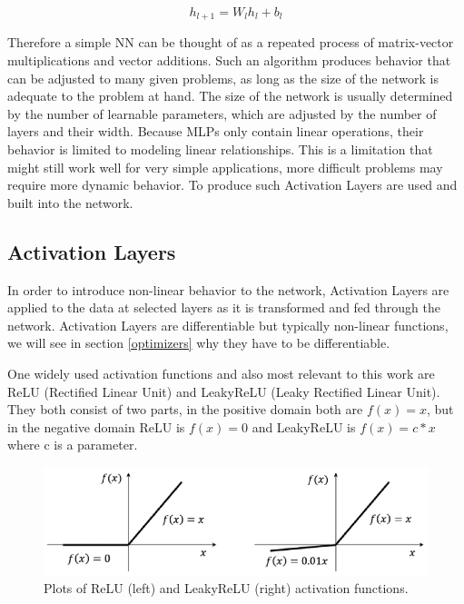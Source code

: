 \documentclass[a4paper,10pt]{scrartcl}
\begin{document}
\begin{equation}
    h_{l+1} = W_lh_l + b_l
\end{equation}

Therefore a simple NN can be thought of as a repeated process of matrix-vector multiplications and vector additions.
Such an algorithm produces behavior that can be adjusted to many given problems, as long as the size of the network is adequate to the problem at hand.
The size of the network is usually determined by the number of learnable parameters, which are adjusted by the number of layers and their width.
Because MLPs only contain linear operations, their behavior is limited to modeling linear relationships.
This is a limitation that might still work well for very simple applications, more difficult problems may require more dynamic behavior.
To produce such Activation Layers are used and built into the network.

\subsection{Activation Layers}

In order to introduce non-linear behavior to the network, Activation Layers are applied to the data at selected layers as it is transformed and fed through the network.
Activation Layers are differentiable but typically non-linear functions, we will see in section \ref{optimizers} why they have to be differentiable.

One widely used activation functions and also most relevant to this work are ReLU (Rectified Linear Unit) and LeakyReLU (Leaky Rectified Linear Unit).
They both consist of two parts, in the positive domain both are $f(x) = x$, but in the negative domain ReLU is $f(x) = 0$ and LeakyReLU is $f(x) = c * x$ where c is a parameter.

\begin{figure}[h]
    \includegraphics[scale=1]{images/relu.png}
    \centering
    \caption{Plots of ReLU (left) and LeakyReLU (right) activation functions.}
    \label{fig:activationfunctions}
\end{figure}
\end{document}

